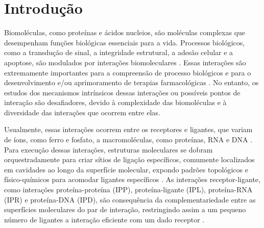 \documentclass[Portugues]{phdquali}
\begin{document}
\clearpage



\tableofcontents

\fimdaspaginasiniciais



\chapter{Introdução}

Biomoléculas, como proteínas e ácidos nucleios, são moléculas complexas que desempenham funções biológicas essenciais para a vida. Processos biológicos, como a transdução de sinal, a integridade estrutural, a adesão celular e a apoptose, são modulados por interações biomoleculares \cite{sotriffer2002,henrich2010}. Essas interações são extremamente importantes para a compreensão de processo biológicos e para o desenvolvimento e/ou aprimoramento de terapias farmacológicas \cite{henrich2010}. No entanto, os estudos dos mecanismos intrínsicos dessas interações ou possíveis pontos de interação são desafiadores, devido à complexidade das biomoléculas e à diversidade das interações que ocorrem entre elas.

Usualmente, essas interações ocorrem entre os receptores e ligantes, que variam de íons, como ferro e fosfato, a macromoléculas, como proteínas, RNA e DNA \cite{oliveira2014}. Para execução dessas interações, estruturas moleculares se dobram orquestradamente para criar sítios de ligação específicos, comumente localizados em cavidades ao longo da superfície molecular, expondo padrões topológicos e físico-químicos para acomodar ligantes específicos \cite{henrich2010,guerra2021}. As interações receptor-ligante, como interações proteína-proteína (IPP), proteína-ligante (IPL), proteína-RNA (IPR) e proteína-DNA (IPD), são consequência da complementariedade entre as superfícies moleculares do par de interação, restringindo assim a um pequeno número de ligantes a interação eficiente com um dado receptor \cite{henrich2010,simoes2017}.
\end{document}
